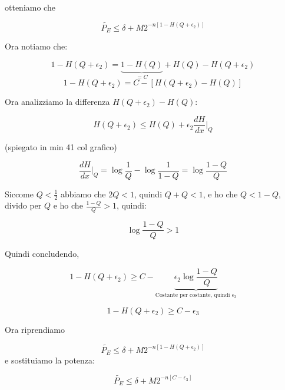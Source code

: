 otteniamo che

\begin{equation*}
\tilde{P_E} \leq \delta + M 2^{-n[1-H(Q+\epsilon_2)]}
\end{equation*}

Ora notiamo che: 

\begin{equation*}
1-H(Q+\epsilon_2) = \underbrace{1 - H(Q)}_{= C} + H(Q) - H(Q+\epsilon_2)
\end{equation*}
\begin{equation*}
1-H(Q+\epsilon_2) = C - [H(Q+\epsilon_2) - H(Q)]
\end{equation*}

Ora analizziamo la differenza $H(Q+\epsilon_2) - H(Q)$:

\begin{equation*}
H(Q+\epsilon_2) \leq H(Q) + \epsilon_2 \frac{dH}{dx}|_Q
\end{equation*}

(spiegato in min 41 col grafico)

\begin{equation*}
\frac{dH}{dx}|_Q = \log\frac1Q - \log\frac{1}{1-Q} = \log\frac{1-Q}{Q}
\end{equation*}

Siccome $Q<\frac12$ abbiamo che $2Q < 1$, quindi $Q + Q < 1$, e ho che $Q < 1 - Q$, divido per $Q$ e ho che $\frac{1 - Q}{Q} > 1$, quindi:

\begin{equation*}
\log\frac{1-Q}{Q} > 1
\end{equation*}

Quindi concludendo, 

\begin{equation*}
1 - H(Q + \epsilon_2) \geq C - \underbrace{\epsilon_2 \log\frac{1-Q}{Q}}_{\text{Costante per costante, quindi } \epsilon_3}
\end{equation*}

\begin{equation*}
1 - H(Q + \epsilon_2) \geq C - \epsilon_3
\end{equation*}

Ora riprendiamo

\begin{equation*}
\tilde{P_E} \leq \delta + M 2^{-n[1-H(Q+\epsilon_2)]}
\end{equation*}
e sostituiamo la potenza:

\begin{equation*}
\tilde{P_E} \leq \delta + M 2^{-n[C - \epsilon_3]}
\end{equation*}

